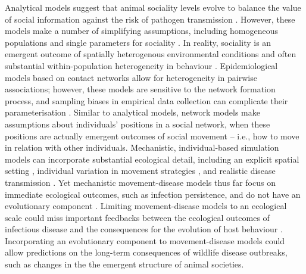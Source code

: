 Analytical models suggest that animal sociality levels evolve to balance the value of social information against the risk of pathogen transmission \citep[][]{bonds2005,prado2009,ashby2021}.
However, these models make a number of simplifying assumptions, including homogeneous populations and single parameters for sociality \citep[][]{bonds2005,prado2009,ashby2021}.
In reality, sociality is an emergent outcome of spatially heterogenous environmental conditions and often substantial within-population heterogeneity in behaviour \citep{tanner2012, wolf2012}.
Epidemiological models based on contact networks allow for heterogeneity in pairwise associations; however, these models are sensitive to the network formation process, and sampling biases in empirical data collection can complicate their parameterisation \citep[][]{white2017}.
Similar to analytical models, network models make assumptions about individuals' positions in a social network, when these positions are actually emergent outcomes of social movement -- i.e., how to move in relation with other individuals.
Mechanistic, individual-based simulation models can incorporate substantial ecological detail, including an explicit spatial setting \citep{deangelis2019}, individual variation in movement strategies \citep{spiegel2017,lunn2021}, and realistic disease transmission \citep{white2018, scherer2020, lunn2021}.
Yet mechanistic movement-disease models thus far focus on immediate ecological outcomes, such as infection persistence, and do not have an evolutionary component \citep{white2018,scherer2020,lunn2021}.
Limiting movement-disease models to an ecological scale could miss important feedbacks between the ecological outcomes of infectious disease and the consequences for the evolution of host behaviour \citep{cantor2021}.
Incorporating an evolutionary component to movement-disease models could allow predictions on the long-term consequences of wildlife disease outbreaks, such as changes in the the emergent structure of animal societies.

